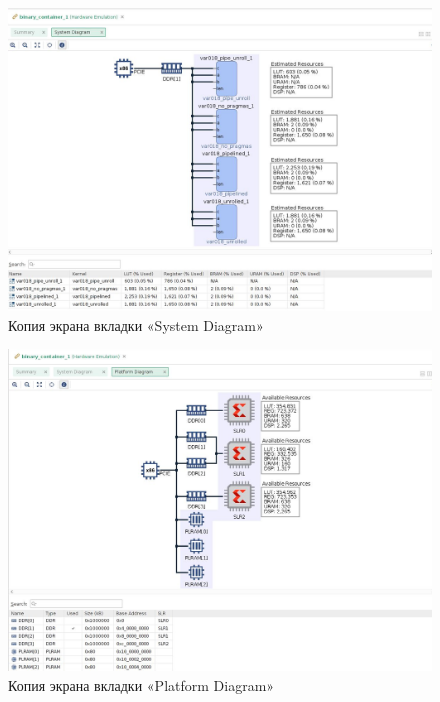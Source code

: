 \begin{figure}[H]
	\begin{center}
		\includegraphics[scale=0.4]{img/system_diagram.png}
	\end{center}
	\captionsetup{justification=centering}
	\caption{Копия экрана вкладки «System Diagram»}
	\label{img:system-diagram}
\end{figure}

\begin{figure}[H]
	\begin{center}
		\includegraphics[scale=0.4]{img/platform_diagram.png}
	\end{center}
	\captionsetup{justification=centering}
	\caption{Копия экрана вкладки «Platform Diagram»}
	\label{img:platform-diagram}
\end{figure}

